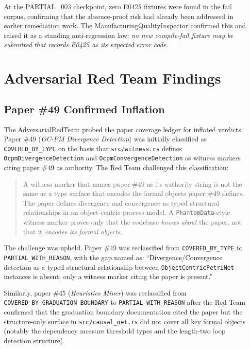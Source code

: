 At the PARTIAL\_003 checkpoint, zero E0425 fixtures were found in the fail
corpus, confirming that the absence-proof risk had already been addressed in
earlier remediation work. The ManufacturingQualityInspector confirmed this
and raised it as a standing anti-regression law: \emph{no new compile-fail
fixture may be submitted that records E0425 as its expected error code}.

\section{Adversarial Red Team Findings}
\label{sec:eval-redteam}

\subsection{Paper \#49 Confirmed Inflation}

The AdversarialRedTeam probed the paper coverage ledger for inflated verdicts.
Paper \#49 (\textit{OC-PM Divergence Detection}) was initially classified as
\texttt{COVERED\_BY\_TYPE} on the basis that \texttt{src/witness.rs} defines
\texttt{OcpmDivergenceDetection} and \texttt{OcpmConvergenceDetection} as
witness markers citing paper \#49 as authority. The Red Team challenged this
classification:

\begin{quote}
A witness marker that names paper \#49 as its authority string is not the same
as a type surface that encodes the formal objects paper \#49 defines. The
paper defines divergence and convergence as typed structural relationships in
an object-centric process model. A \texttt{PhantomData}-style witness marker
proves only that the codebase \emph{knows about} the paper, not that it
\emph{encodes its formal objects}.
\end{quote}

The challenge was upheld. Paper \#49 was reclassified from
\texttt{COVERED\_BY\_TYPE} to \texttt{PARTIAL\_WITH\_REASON}, with the gap
named as: ``Divergence/Convergence detection as a typed structural
relationship between \texttt{ObjectCentricPetriNet} instances is absent; only
a witness marker citing the paper is present.''

Similarly, paper \#45 (\textit{Heuristics Miner}) was reclassified from
\texttt{COVERED\_BY\_GRADUATION\_BOUNDARY} to \texttt{PARTIAL\_WITH\_REASON}
after the Red Team confirmed that the graduation boundary documentation cited
the paper but the structure-only surface in \texttt{src/causal\_net.rs} did
not cover all key formal objects (notably the dependency measure threshold
types and the length-two loop detection structure).

